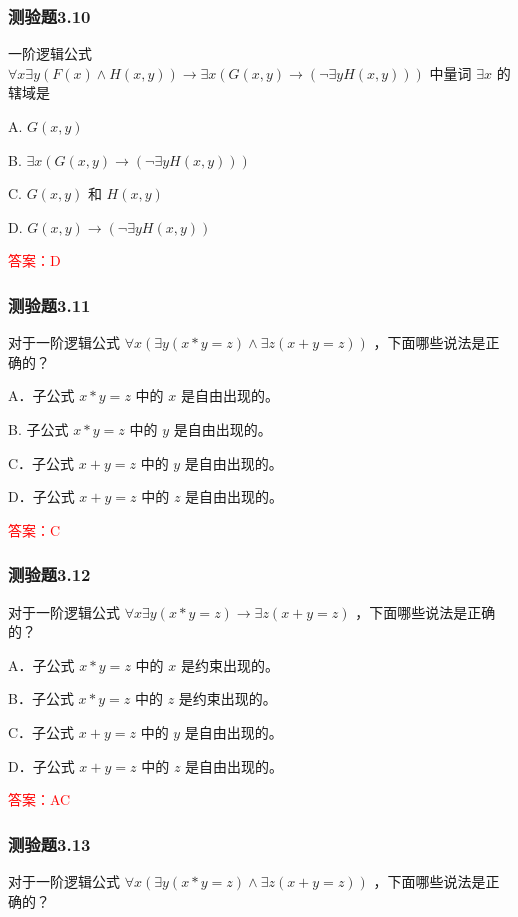 \documentclass[UTF8, heading=true]{ctexart}
\begin{document}
\subsubsection{测验题3.10}

一阶逻辑公式 $\forall x \exists y(F(x) \wedge H(x, y)) \rightarrow \exists x(G(x, y) \rightarrow(\neg \exists y H(x, y)))$ 
中量词 $\exists x$ 的辖域是 $\qquad$

A. $G(x, y)$

B. $\exists x(G(x, y) \rightarrow(\neg \exists y H(x, y)))$

C. $G(x, y)$ 和 $H(x, y)$

D. $G(x, y) \rightarrow(\neg \exists y H(x, y))$

\textcolor{red}{答案：D}

\subsubsection{测验题3.11}

对于一阶逻辑公式 $\forall x(\exists y(x * y=z) \wedge \exists z(x+y=z))$ ，下面哪些说法是正确的？

A．子公式 $x * y=z$ 中的 $x$ 是自由出现的。

B. 子公式 $x * y=z$ 中的 $y$ 是自由出现的。

C．子公式 $x+y=z$ 中的 $y$ 是自由出现的。

D．子公式 $x+y=z$ 中的 $z$ 是自由出现的。

\textcolor{red}{答案：C}

\subsubsection{测验题3.12}

对于一阶逻辑公式 $\forall x \exists y(x * y=z) \rightarrow \exists z(x+y=z)$ ，下面哪些说法是正确的？

A．子公式 $x * y=z$ 中的 $x$ 是约束出现的。

B．子公式 $x * y=z$ 中的 $z$ 是约束出现的。

C．子公式 $x+y=z$ 中的 $y$ 是自由出现的。

D．子公式 $x+y=z$ 中的 $z$ 是自由出现的。

\textcolor{red}{答案：AC}

\subsubsection{测验题3.13}

对于一阶逻辑公式 $\forall x(\exists y(x * y=z) \wedge \exists z(x+y=z))$ ，下面哪些说法是正确的？
\end{document}
